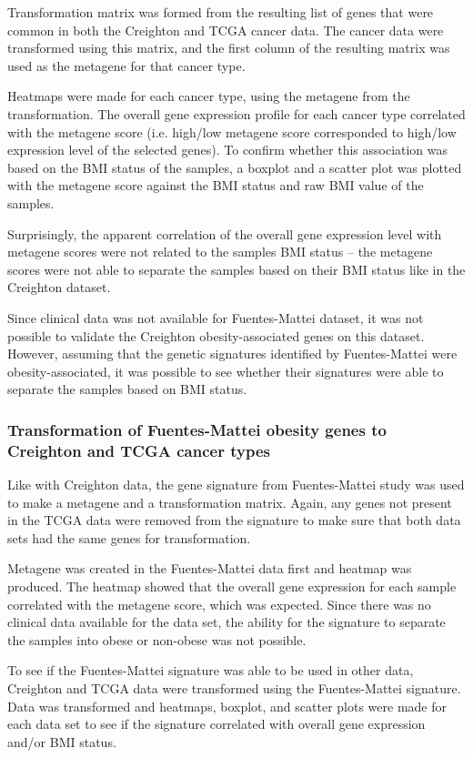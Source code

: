 \documentclass[a4paper, 11pt]{article}
\begin{document}
Transformation matrix was formed from the resulting list of genes that were common in both the Creighton and TCGA cancer data.
The cancer data were transformed using this matrix, and the first column of the resulting matrix was used as the metagene for that cancer type.

Heatmaps were made for each cancer type, using the metagene from the transformation.
The overall gene expression profile for each cancer type correlated with the metagene score (i.e. high/low metagene score corresponded to high/low expression level of the selected genes).
To confirm whether this association was based on the BMI status of the samples, a boxplot and a scatter plot was plotted with the metagene score against the BMI status and raw BMI value of the samples.

Surprisingly, the apparent correlation of the overall gene expression level with metagene scores were not related to the samples BMI status -- the metagene scores were not able to separate the samples based on their BMI status like in the Creighton dataset.

Since clinical data was not available  for Fuentes-Mattei  dataset, it was not possible to validate the Creighton obesity-associated genes on this dataset.
However, assuming that the genetic signatures identified by Fuentes-Mattei were obesity-associated, it was possible to see whether their signatures were able to separate the samples based on BMI status.

\subsubsection*{Transformation of Fuentes-Mattei obesity genes to Creighton and TCGA cancer types}

Like with Creighton data, the gene signature from Fuentes-Mattei study was used to make a metagene and a transformation matrix.
Again, any genes not present in the TCGA data were removed from the signature to make sure that both data sets had the same genes for transformation.

Metagene was created in the Fuentes-Mattei data first and heatmap was produced.
The heatmap showed that the overall gene expression for each sample correlated with the metagene score, which was expected.
Since there was no clinical data available for the data set, the ability for the signature to separate the samples into obese or non-obese was not possible.

To see if the Fuentes-Mattei signature was able to be used in other data, Creighton and TCGA data were transformed using the Fuentes-Mattei signature.
Data was transformed and heatmaps, boxplot, and scatter plots were made for each data set to see if the signature correlated with overall gene expression and/or BMI status.
\end{document}
